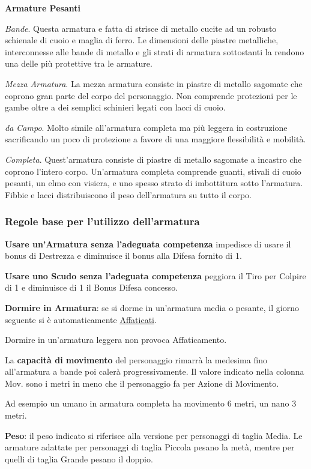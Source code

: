 \begin{multicols}{2}
\textbf{Armature Pesanti}

\emph{Bande}. Questa armatura e fatta di strisce di metallo cucite ad un robusto schienale di cuoio e maglia di ferro. Le dimensioni delle piastre metalliche, interconnesse alle bande di metallo e gli strati di armatura sottostanti la rendono una delle più protettive tra le armature.

\emph{Mezza Armatura}. La mezza armatura consiste in piastre di metallo sagomate che coprono gran parte del corpo del personaggio. Non comprende protezioni per le gambe oltre a dei semplici schinieri legati con lacci di cuoio.

\emph{da Campo}. Molto simile all'armatura completa ma più leggera in costruzione sacrificando un poco di protezione a favore di una maggiore flessibilità e mobilità.

\emph{Completa}. Quest'armatura consiste di piastre di metallo sagomate a incastro che coprono l'intero corpo. Un'armatura completa comprende guanti, stivali di cuoio pesanti, un elmo con visiera, e uno spesso strato di imbottitura sotto l'armatura. Fibbie e lacci distribuiscono il peso dell'armatura su tutto il corpo.


\subsubsection{Regole base per l'utilizzo dell'armatura}

\textbf{Usare un'Armatura senza l'adeguata competenza} impedisce di usare il bonus di Destrezza e diminuisce il bonus alla Difesa fornito di 1.

\textbf{Usare uno Scudo senza l'adeguata competenza} peggiora il Tiro per Colpire di 1 e diminuisce di 1 il Bonus Difesa concesso.

\textbf{Dormire in Armatura}: se si dorme in un'armatura media o pesante, il giorno seguente si è automaticamente \hyperlink{affaticato}{Affaticati}.

Dormire in un'armatura leggera non provoca Affaticamento.

La \textbf{capacità di movimento} del personaggio rimarrà la medesima fino all'armatura a bande poi calerà progressivamente. Il valore indicato nella colonna Mov. sono i metri in meno che il personaggio fa per Azione di Movimento.

Ad esempio un umano in armatura completa ha movimento 6 metri, un nano 3 metri.

\textbf{Peso}: il peso indicato si riferisce alla versione per personaggi di taglia Media. Le armature adattate per personaggi di taglia Piccola pesano la metà, mentre per quelli di taglia Grande pesano il doppio.


\end{multicols}
